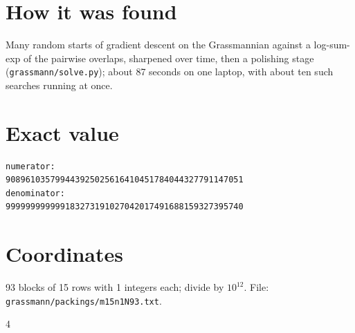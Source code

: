 \documentclass[11pt,a4paper]{article}
\begin{document}
\section{How it was found}
Many random starts of gradient descent on the Grassmannian against a log-sum-exp of the pairwise overlaps, sharpened over time, then a polishing stage (\texttt{grassmann/solve.py}); about 87 seconds on one laptop, with about ten such searches running at once.


\appendix
\section{Exact value}
{\small
\begin{verbatim}
numerator:
908961035799443925025616410451784044327791147051
denominator:
999999999999183273191027042017491688159327395740
\end{verbatim}}

\section{Coordinates}
93 blocks of 15 rows with 1 integers each; divide by $10^{12}$. File: \texttt{grassmann/packings/m15n1N93.txt}.
{\tiny
\begin{multicols}{4}
\end{multicols}}
\end{document}
